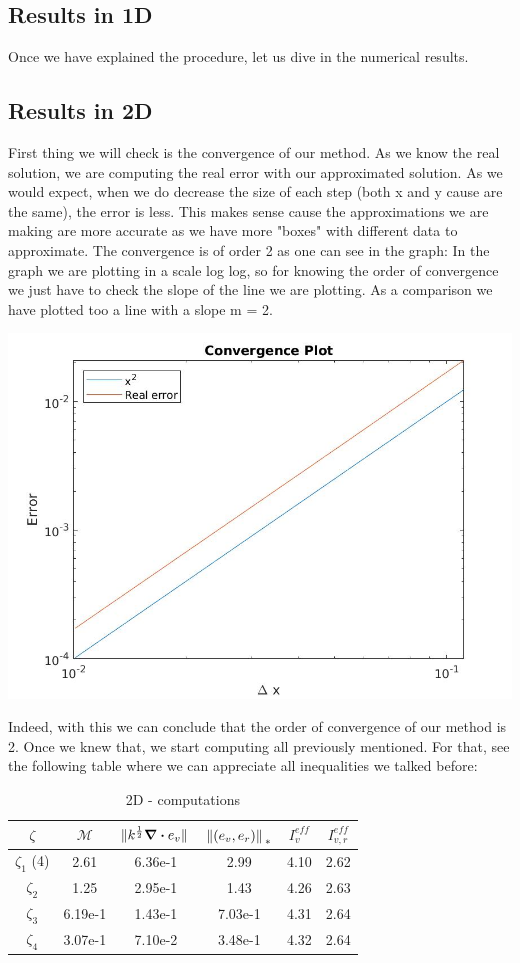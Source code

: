 \documentclass{article}
\begin{document}
    \subsection*{Results in 1D}
    Once we have explained the procedure, let us dive in the numerical results.

    \subsection*{Results in 2D}
    First thing we will check is the convergence of our method. As we know the real solution, we are computing the real error with our approximated solution. As we would expect, when we do decrease the size of each step (both x and y cause are the same), the error is less. This makes sense cause the approximations we are making are more accurate as we have more "boxes" with different data to approximate. The convergence is of order 2 as one can see in the graph:
    In the graph we are plotting in a scale log log, so for knowing the order of convergence we just have to check the slope of the line we are plotting. As a comparison we have plotted too a line with a slope m = 2.
    \begin{center}
        \includegraphics[width = 0.7\linewidth]{../Images/convergence2d.jpg}
    \end{center}

    Indeed, with this we can conclude that the order of convergence of our method is 2. Once we knew that, we start computing all previously mentioned. For that, see the following table where we can appreciate all inequalities we talked before:
    \begin{table}[h!]
        \centering
        \begin{tabular}{c | c | c | c | c | c }
            $\zeta$ & $\mathcal{M}$  & $\norm*{k^{\frac{1}{2}}\div e_v}$ & $\norm*{(e_v,e_r)}_{*}$ & $I_v^{eff}$ & $I_{v,r}^{eff}$ \\
            \hline \hline
            $\zeta_1$ (4) & 2.61 & 6.36e-1 & 2.99 & 4.10 & 2.62 \\ 
            $\zeta_2$ & 1.25 & 2.95e-1 & 1.43 & 4.26 & 2.63 \\
            $\zeta_3$ & 6.19e-1 & 1.43e-1& 7.03e-1 & 4.31 & 2.64 \\
            $\zeta_4$ & 3.07e-1 & 7.10e-2 & 3.48e-1 & 4.32 & 2.64 \\
        \end{tabular}
        \caption{2D - computations}
    \end{table}
    
\end{document}
